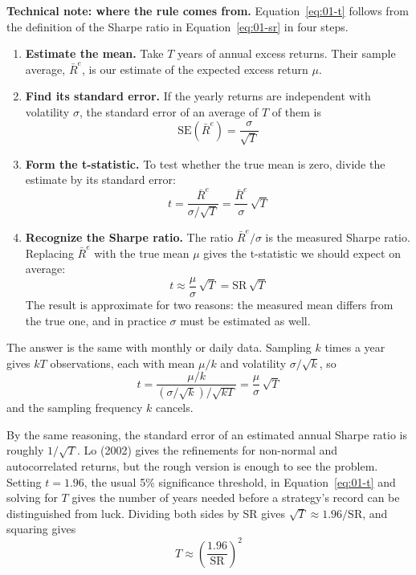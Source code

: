 \begin{technote}
\textbf{Technical note: where the rule comes from.} Equation~\eqref{eq:01-t} follows from the definition of the Sharpe ratio in Equation~\eqref{eq:01-sr} in four steps.

\begin{enumerate}
  \item \textbf{Estimate the mean.} Take $T$ years of annual excess returns. Their sample average, $\bar{R}^{e}$, is our estimate of the expected excess return $\mu$.
  \item \textbf{Find its standard error.} If the yearly returns are independent with volatility $\sigma$, the standard error of an average of $T$ of them is
  \begin{equation}
    \mathrm{SE}(\bar{R}^{e}) = \frac{\sigma}{\sqrt{T}} \nonumber
  \end{equation}
  \item \textbf{Form the t-statistic.} To test whether the true mean is zero, divide the estimate by its standard error:
  \begin{equation}
    t = \frac{\bar{R}^{e}}{\sigma/\sqrt{T}} = \frac{\bar{R}^{e}}{\sigma}\,\sqrt{T} \nonumber
  \end{equation}
  \item \textbf{Recognize the Sharpe ratio.} The ratio $\bar{R}^{e}/\sigma$ is the measured Sharpe ratio. Replacing $\bar{R}^{e}$ with the true mean $\mu$ gives the t-statistic we should expect on average:
  \begin{equation}
    t \approx \frac{\mu}{\sigma}\,\sqrt{T} = \mathrm{SR}\,\sqrt{T} \nonumber
  \end{equation}
  The result is approximate for two reasons: the measured mean differs from the true one, and in practice $\sigma$ must be estimated as well.
\end{enumerate}

The answer is the same with monthly or daily data. Sampling $k$ times a year gives $kT$ observations, each with mean $\mu/k$ and volatility $\sigma/\sqrt{k}$, so
\begin{equation}
  t = \frac{\mu/k}{(\sigma/\sqrt{k})/\sqrt{kT}} = \frac{\mu}{\sigma}\,\sqrt{T} \nonumber
\end{equation}
and the sampling frequency $k$ cancels.
\end{technote}

By the same reasoning, the standard error of an estimated annual Sharpe ratio is roughly $1/\sqrt{T}$. Lo (2002) gives the refinements for non-normal and autocorrelated returns, but the rough version is enough to see the problem. Setting $t = 1.96$, the usual 5\% significance threshold, in Equation~\eqref{eq:01-t} and solving for $T$ gives the number of years needed before a strategy's record can be distinguished from luck. Dividing both sides by SR gives $\sqrt{T} \approx 1.96/\mathrm{SR}$, and squaring gives
\begin{equation}
  T \approx \left(\frac{1.96}{\mathrm{SR}}\right)^2
  \label{eq:01-T}
\end{equation}

